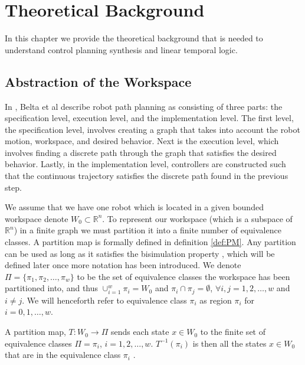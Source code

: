 \chapter{Theoretical Background}
In this chapter we provide the theoretical background that is needed to understand control planning synthesis and linear temporal logic. 
\section{Abstraction of the Workspace}
In \cite{belta07}, Belta et al describe robot path planning as consisting of three parts: the specification level, execution level, and the implementation level. The first level, the specification level, involves creating a graph that takes into account the robot motion, workspace, and desired behavior. Next is the execution level, which involves finding a discrete path through the graph that satisfies the desired behavior. Lastly, in the implementation level, controllers are constructed such that the continuous trajectory satisfies the discrete path found in the previous step. 

We assume that we have one robot which is located in a given bounded workspace denote $W_0 \subset \mathbb{R}^n$. To represent our workspace (which is a subspace of $\mathbb{R}^n$) in a finite graph we must partition it into a finite number of equivalence classes. A partition map is formally defined in definition \ref{def:PM}. Any partition can be used as long as it satisfies the bisimulation property \cite{belta04}, which will be defined later once more notation has been introduced. We denote $\Pi = \{\pi_1, \pi_2, \dots, \pi_w\}$ to be the set of equivalence classes the workspace has been partitioned into, and thus $\cup_{i=1}^w \pi_i = W_0$ and $\pi_i \cap \pi_j = \emptyset$, $\forall i,j=1,2,\dots,w$ and $i\neq j$. We will henceforth refer to equivalence class $\pi_i$ as region $\pi_i$ for $i = 0,1,\dots, w$. 

\begin{definition}
\label{def:PM}
A partition map, $T: W_0 \rightarrow \Pi$ sends each state $x \in W_0$ to the finite set of equivalence classes $\Pi = {\pi_i}$,  $i = 1,2,\dots ,w$. $T^{-1}(\pi_i)$ is then all the states $x \in W_0$ that are in the equivalence class $\pi_i$ \cite{fainekos05}. 
\end{definition} 

